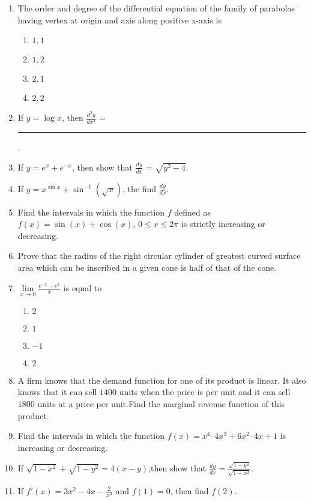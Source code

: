 \begin{enumerate}
\item The order and degree of the differential equation of the family of parabolas having vertex at origin and axis along positive x-axis is
\begin{enumerate}
    \item $1,1$
    \item $1,2$
    \item $2,1$
    \item $2,2$
\end{enumerate}
\item If $y = \log x$, then $\frac{d^2y}{dx^2}$ =  \rule{30pt}{1pt}.
\item If $y = e^x + e^{-x}$, then show that $\frac{dy}{dx}$ = $\sqrt{y^2 - 4}$.

\item If $y=x^{\sin x }+\sin^{-1}(\sqrt x)$, the find $\frac{dy}{dx}$.
\item Find the intervals in which the function $f$ defined as $f(x) = \sin(x) + \cos(x)$, $0 \leq x \leq 2\pi$ is strictly increasing or decreasing.
\item Prove that the radius of the right circular cylinder of greatest curved surface area which can be inscribed in a given cone is half of that of the cone. 
\item $\lim\limits_{x \to 0}{\frac{e^{-x} - e^x}{x}}$ is equal to
\begin{enumerate}
    \item $2$
    \item $1$
    \item $-1$
    \item $2$
\end{enumerate}


\item A firm knows that the demand function for one of its product is linear. It also knows that it can sell $1400$ units when the price is  per unit and it can sell $1800$ units at a price  per unit.Find the marginal revenue function of this product.

\item Find the intervals in which the function $f(x) = x^{4}–4x^{3}+6x^{2}–4x+1$ is increasing or decreasing.

\item If $\sqrt{1-x^{2}}+\sqrt{1-y^{2}}=4(x-y)$,then show that $\frac{dy}{dx}=\frac{\sqrt{1-y^{2}}}{\sqrt{1-x^{2}}}$.


\item If $f'(x)=3x^{2}-4x-\frac{2}{x^{3}}$ and $f(1)=0$, then find $f(2)$.


\end{enumerate}
